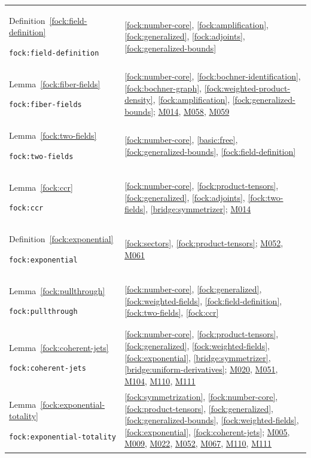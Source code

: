 \documentclass[11pt,a4paper]{article}
\theoremstyle{definition}
\theoremstyle{remark}
\begin{document}
\begin{longtable}{@{}p{}p{}@{}}
Definition~\ref{fock:field-definition}\par\nolinkurl{fock:field-definition} & \ref{fock:number-core}, \ref{fock:amplification}, \ref{fock:generalized}, \ref{fock:adjoints}, \ref{fock:generalized-bounds} \\[4pt]
Lemma~\ref{fock:fiber-fields}\par\nolinkurl{fock:fiber-fields} & \ref{fock:number-core}, \ref{fock:bochner-identification}, \ref{fock:bochner-graph}, \ref{fock:weighted-product-density}, \ref{fock:amplification}, \ref{fock:generalized-bounds}; \hyperref[base:M014]{M014}, \hyperref[base:M058]{M058}, \hyperref[base:M059]{M059} \\[4pt]
Lemma~\ref{fock:two-fields}\par\nolinkurl{fock:two-fields} & \ref{fock:number-core}, \ref{basic:free}, \ref{fock:generalized-bounds}, \ref{fock:field-definition} \\[4pt]
Lemma~\ref{fock:ccr}\par\nolinkurl{fock:ccr} & \ref{fock:number-core}, \ref{fock:product-tensors}, \ref{fock:generalized}, \ref{fock:adjoints}, \ref{fock:two-fields}, \ref{bridge:symmetrizer}; \hyperref[base:M014]{M014} \\[4pt]
Definition~\ref{fock:exponential}\par\nolinkurl{fock:exponential} & \ref{fock:sectors}, \ref{fock:product-tensors}; \hyperref[base:M052]{M052}, \hyperref[base:M061]{M061} \\[4pt]
Lemma~\ref{fock:pullthrough}\par\nolinkurl{fock:pullthrough} & \ref{fock:number-core}, \ref{fock:generalized}, \ref{fock:weighted-fields}, \ref{fock:field-definition}, \ref{fock:two-fields}, \ref{fock:ccr} \\[4pt]
Lemma~\ref{fock:coherent-jets}\par\nolinkurl{fock:coherent-jets} & \ref{fock:number-core}, \ref{fock:product-tensors}, \ref{fock:generalized}, \ref{fock:weighted-fields}, \ref{fock:exponential}, \ref{bridge:symmetrizer}, \ref{bridge:uniform-derivatives}; \hyperref[base:M020]{M020}, \hyperref[base:M051]{M051}, \hyperref[base:M104]{M104}, \hyperref[base:M110]{M110}, \hyperref[base:M111]{M111} \\[4pt]
Lemma~\ref{fock:exponential-totality}\par\nolinkurl{fock:exponential-totality} & \ref{fock:symmetrization}, \ref{fock:number-core}, \ref{fock:product-tensors}, \ref{fock:generalized}, \ref{fock:generalized-bounds}, \ref{fock:weighted-fields}, \ref{fock:exponential}, \ref{fock:coherent-jets}; \hyperref[base:M005]{M005}, \hyperref[base:M009]{M009}, \hyperref[base:M022]{M022}, \hyperref[base:M052]{M052}, \hyperref[base:M067]{M067}, \hyperref[base:M110]{M110}, \hyperref[base:M111]{M111} \\[4pt]

\end{longtable}
\end{document}
